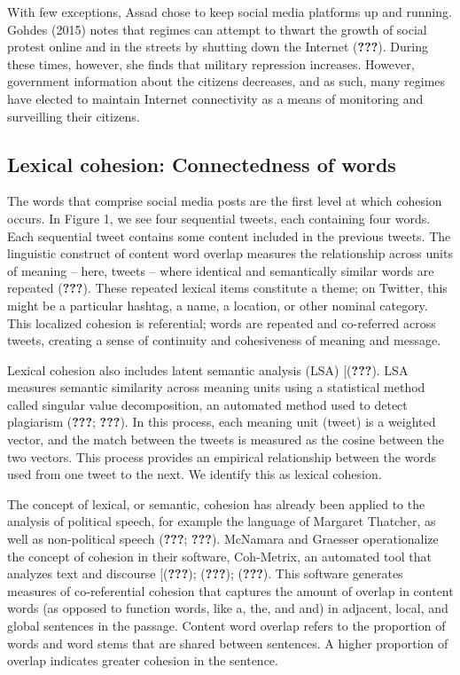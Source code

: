 \documentclass[english,man]{apa6}
\begin{document}
With few exceptions, Assad chose to keep social media platforms up and running. Gohdes (2015) notes that regimes can attempt to thwart the growth of social protest online and in the streets by shutting down the Internet ({\textbf{???}}). During these times, however, she finds that military repression increases. However, government information about the citizens decreases, and as such, many regimes have elected to maintain Internet connectivity as a means of monitoring and surveilling their citizens.

\hypertarget{lexical-cohesion-connectedness-of-words}{%
\subsection{Lexical cohesion: Connectedness of words}\label{lexical-cohesion-connectedness-of-words}}

The words that comprise social media posts are the first level at which cohesion occurs. In Figure 1, we see four sequential tweets, each containing four words. Each sequential tweet contains some content included in the previous tweets. The linguistic construct of content word overlap measures the relationship across units of meaning -- here, tweets -- where identical and semantically similar words are repeated ({\textbf{???}}). These repeated lexical items constitute a theme; on Twitter, this might be a particular hashtag, a name, a location, or other nominal category. This localized cohesion is referential; words are repeated and co-referred across tweets, creating a sense of continuity and cohesiveness of meaning and message.

Lexical cohesion also includes latent semantic analysis (LSA) {[}({\textbf{???}}). LSA measures semantic similarity across meaning units using a statistical method called singular value decomposition, an automated method used to detect plagiarism ({\textbf{???}}; {\textbf{???}}). In this process, each meaning unit (tweet) is a weighted vector, and the match between the tweets is measured as the cosine between the two vectors. This process provides an empirical relationship between the words used from one tweet to the next. We identify this as lexical cohesion.

The concept of lexical, or semantic, cohesion has already been applied to the analysis of political speech, for example the language of Margaret Thatcher, as well as non-political speech ({\textbf{???}}; {\textbf{???}}). McNamara and Graesser operationalize the concept of cohesion in their software, Coh-Metrix, an automated tool that analyzes text and discourse {[}({\textbf{???}}); ({\textbf{???}}); ({\textbf{???}}). This software generates measures of co-referential cohesion that captures the amount of overlap in content words (as opposed to function words, like a, the, and and) in adjacent, local, and global sentences in the passage. Content word overlap refers to the proportion of words and word stems that are shared between sentences. A higher proportion of overlap indicates greater cohesion in the sentence.
\end{document}
